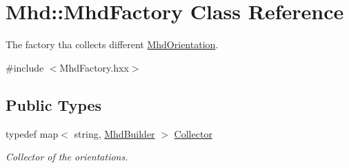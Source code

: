 \hypertarget{classMhd_1_1MhdFactory}{\section{\-Mhd\-:\-:\-Mhd\-Factory \-Class \-Reference}
\label{classMhd_1_1MhdFactory}
}


\-The factory tha collects different \hyperlink{classMhd_1_1MhdOrientation}{\-Mhd\-Orientation}.  




{\ttfamily \#include $<$\-Mhd\-Factory.\-hxx$>$}

\subsection*{\-Public \-Types}
\begin{DoxyCompactItemize}
\item 
typedef map$<$ string, \hyperlink{namespaceMhd_a9b520e48eb7e726a85e6224875935aff}{\-Mhd\-Builder} $>$ \hyperlink{classMhd_1_1MhdFactory_a6e31a057f01600271f9eab07a6684283}{\-Collector}
\begin{DoxyCompactList}\small\item\em \-Collector of the orientations. \end{DoxyCompactList}\end{DoxyCompactItemize}
